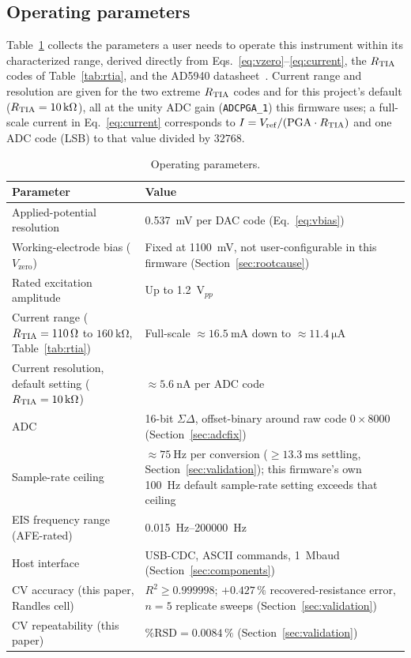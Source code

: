 \subsection{Operating parameters}
\label{sec:params}
Table~\ref{tab:params} collects the parameters a user needs to operate
this instrument within its characterized range, derived directly from
Eqs.~\eqref{eq:vzero}--\eqref{eq:current}, the $R_{\mathrm{TIA}}$ codes of
Table~\ref{tab:rtia}, and the AD5940 datasheet~\cite{devices2024ad5940}.
Current range and resolution are given for the two extreme $R_{\mathrm{TIA}}$ codes
and for this project's default ($R_{\mathrm{TIA}}=\SI{10}{\kilo\ohm}$), all at the
unity ADC gain (\texttt{ADCPGA\_1}) this firmware uses; a full-scale
current in Eq.~\eqref{eq:current} corresponds to
$I=V_{\mathrm{ref}}/(\mathrm{PGA}\cdot R_{\mathrm{TIA}})$ and one ADC code (LSB) to
that value divided by $32768$.

\begin{table}[H]
\centering
\footnotesize
\setlength{\tabcolsep}{4pt}
\caption{Operating parameters.}
\label{tab:params}
\begin{tabular}{@{}p{3.3cm}p{4.3cm}@{}}
\toprule
Parameter & Value \\
\midrule
Applied-potential resolution & \SI{0.537}{\milli\volt} per DAC code
  (Eq.~\eqref{eq:vbias}) \\
Working-electrode bias ($V_{\mathrm{zero}}$) & Fixed at \SI{1100}{\milli\volt},
  not user-configurable in this firmware (Section~\ref{sec:rootcause}) \\
Rated excitation amplitude & Up to \SI{1.2}{\volt}$_{pp}$~\cite{devices2024ad5940} \\
Current range ($R_{\mathrm{TIA}}=\SI{110}{\ohm}$ to $\SI{160}{\kilo\ohm}$,
  Table~\ref{tab:rtia}) & Full-scale $\approx\SI{16.5}{\milli\ampere}$ down
  to $\approx\SI{11.4}{\micro\ampere}$ \\
Current resolution, default setting ($R_{\mathrm{TIA}}=\SI{10}{\kilo\ohm}$) &
  $\approx\SI{5.6}{\nano\ampere}$ per ADC code \\
ADC & 16-bit $\Sigma\Delta$, offset-binary around raw code $0{\times}8000$
  (Section~\ref{sec:adcfix}) \\
Sample-rate ceiling & $\approx\SI{75}{\hertz}$ per conversion
  ($\geq\SI{13.3}{\milli\second}$ settling, Section~\ref{sec:validation});
  this firmware's own \SI{100}{\hertz} default sample-rate setting exceeds
  that ceiling \\
EIS frequency range (AFE-rated) & \SIrange{0.015}{200000}{\hertz}~\cite{devices2024ad5940} \\
Host interface & USB-CDC, ASCII commands, \SI{1}{\mega baud}
  (Section~\ref{sec:components}) \\
CV accuracy (this paper, Randles cell) & $R^2\geq0.999998$;
  $+0.427\,\%$ recovered-resistance error, $n=5$ replicate sweeps
  (Section~\ref{sec:validation}) \\
CV repeatability (this paper) & $\%\mathrm{RSD}=0.0084\,\%$ (Section~\ref{sec:validation}) \\
\bottomrule
\end{tabular}
\end{table}
